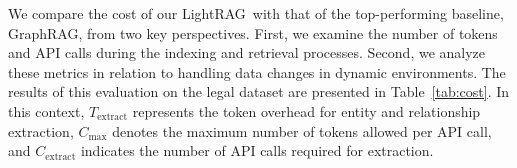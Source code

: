 \documentclass{article} %
\def\model{LightRAG}
\begin{document}

We compare the cost of our \model\ with that of the top-performing baseline, GraphRAG, from two key perspectives. First, we examine the number of tokens and API calls during the indexing and retrieval processes. Second, we analyze these metrics in relation to handling data changes in dynamic environments. The results of this evaluation on the legal dataset are presented in Table~\ref{tab:cost}. In this context, $T_{\text{extract}}$ represents the token overhead for entity and relationship extraction, $C_{\text{max}}$ denotes the maximum number of tokens allowed per API call, and $C_{\text{extract}}$ indicates the number of API calls required for extraction.
\end{document}
